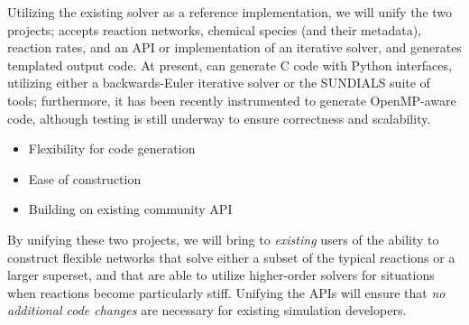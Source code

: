 Utilizing the existing \grackle{}
solver as a reference implementation, we will unify the two projects; \dengo{}
accepts reaction networks, chemical species (and their metadata), reaction
rates, and an API or implementation of an iterative solver, and generates
templated output code.  At present, \dengo{} can generate C code with Python
interfaces, utilizing either a backwards-Euler iterative solver or the SUNDIALS
suite of tools; furthermore, it has been recently instrumented to generate
OpenMP-aware code, although testing is still underway to ensure correctness and
scalability.

\begin{itemize}
\item Flexibility for code generation
\item Ease of construction
\item Building on existing community API
\end{itemize}

By unifying these two projects, we will bring to \textit{existing} users of
\grackle{} the ability to construct flexible networks that solve either a subset
of the typical reactions or a larger superset, and that are able to utilize
higher-order solvers for situations when reactions become particularly stiff.
Unifying the APIs will ensure that \textit{no additional code changes} are
necessary for existing simulation developers.
